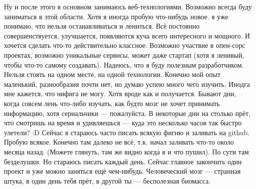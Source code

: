 Ну и после этого в основном занимаюсь веб-технологиями. Возможно всегда буду заниматься в этой области. Хотя я иногда пробую что-нибудь новое. я уже понимаю, что нельзя останавливаться и лениться.
Всё постоянно совершенствуется, улучшается, появляются куча всего интересного и мощного. И хочется сделать что-то действительно классное.
Возможно участвие в опен-сорс проектах, возможно уникальные сервисы, может даже стартап (хотя я ленивый, чтобы что-то самому создавать). 
Надеюсь, что я буду полезным разработчиком. 
Нельзя стоять на одном месте, на одной технологии. Конечно мой опыт маленький, разнообразия почти нет, но думаю успею много чего изучить.
Инодга мне кажется, что нифига не могу. Хотя вроде как и получается. Бывают дни, когда совсем лень что-либо изучать, как будто мозг не хочет принимать информацию, хотя сериальчики --- пожалуйста.
В некоторые дни на столько прёт, что смотришь на время и удивляешься --- куда это несколько часов так быстро улетели? :D
Сейчас я стараюсь часто писать всякую фигню и заливать на github. Пробую всякое. Конечно там далеко не всё, т.к. начал заливать что-то около месяца назад. (Можете глянуть, там же видно когда я и что пушил).
По сути там безделушки. Но стараюсь писать каждый день. Сейчас главное закончить один проект и уже можно заняться ещё чем-нибудь. 
Человеческий мозг --- странная штука, в один день тебя прёт, в другой ты --- бесполезная биомасса.